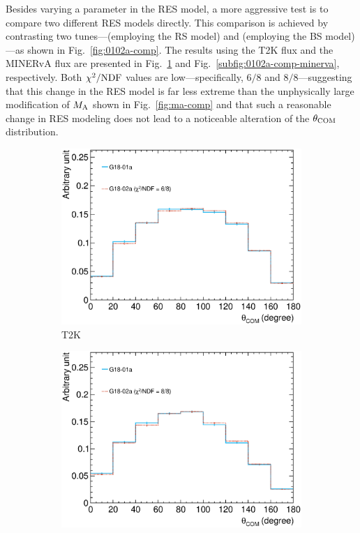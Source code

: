      Besides varying a parameter in the RES model, a more aggressive test is to compare two different RES models directly.
     This comparison is achieved by contrasting two \genie tunes—\geoa (employing the RS model) and \getwoa (employing the BS model)—as shown in Fig.~\ref{fig:0102a-comp}.
     The results using the T2K flux and the MINERvA flux are presented in Fig.~\ref{subfig:0102a-comp-t2k} and Fig.~\ref{subfig:0102a-comp-minerva}, respectively.
     Both $\chi^2/{\textrm{NDF}}$ values are low—specifically, $6/8$ and $8/8$—suggesting that this change in the RES model is far less extreme than the unphysically large modification of $M_{\textrm{A}}$ shown in Fig.~\ref{fig:ma-comp} and that such a reasonable change in RES modeling does not lead to a noticeable alteration of the $\theta_{\textrm{COM}}$ distribution.
     \begin{figure}
     \centering
     \begin{subfigure}[b]{\dbfigwid\textwidth}
          \centering
          \includegraphics[width=\textwidth]{figures/COM/anorm-01a-02a_da_tan.eps}
          \caption{T2K}
          \label{subfig:0102a-comp-t2k}
     \end{subfigure}
     \begin{subfigure}[b]{\dbfigwid\textwidth}
          \centering
          \includegraphics[width=\textwidth]{figures/COM/anorm-01a-02a-minerva_da_tan.eps}

\end{subfigure}
\end{figure}
